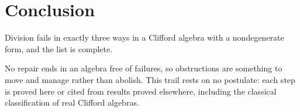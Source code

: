 \documentclass[11pt]{article}
\theoremstyle{definition}
\theoremstyle{plain}
\begin{document}
\section*{Conclusion}
Division fails in exactly three ways in a Clifford algebra with a nondegenerate form, and the list is complete.

No repair ends in an algebra free of failures, so obstructions are something to move and manage rather than abolish. This trail rests on no postulate: each step is proved here or cited from results proved elsewhere, including the classical classification of real Clifford algebras.
\end{document}
